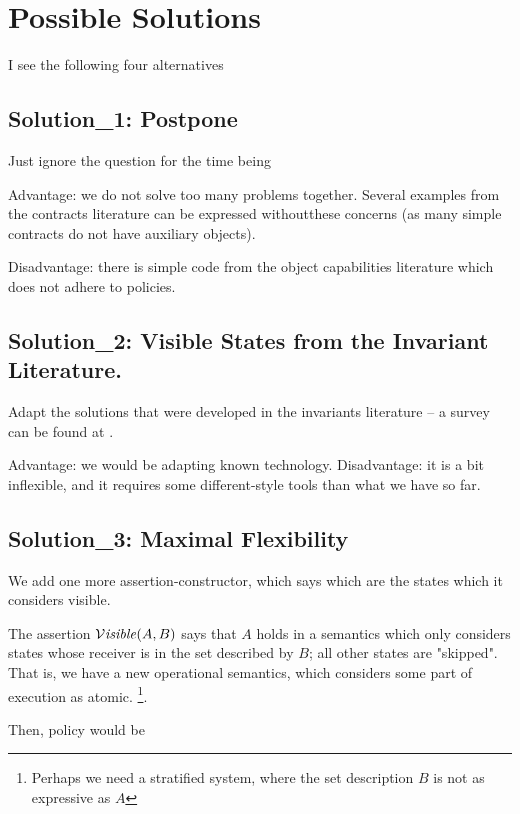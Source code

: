 \documentclass[acmsmall,screen]{acmart}
\begin{document}
  
  \section{Possible Solutions} 
  
 I see the following four alternatives
  
\subsection{Solution\_1: Postpone}
Just ignore the question for the time being


Advantage:  we do not solve too many problems together. Several examples from the contracts literature can be expressed withoutthese concerns (as many simple contracts do not have auxiliary objects).


Disadvantage: there is simple code from the object capabilities literature which does not adhere to policies.

\subsection{Solution\_2: Visible States from the Invariant Literature.}

Adapt the solutions that were developed in the invariants literature -- a survey can be 
found at \cite{DrossoFrancaMuellerSummers08}.
 
Advantage:  we would be adapting known technology.
Disadvantage:  it is a bit inflexible, and it
 requires some different-style tools than what we have so far.

\subsection{Solution\_3: Maximal Flexibility}


We add one more assertion-constructor, which says which are the states which it considers visible.

The assertion $\mathcal{V}\textrm{\textit{isible}}(A,B)$ says that $A$ holds in a semantics which only considers states whose  receiver is  in the set  described by $B$; all other states are "skipped". That is, we have a new operational semantics, which considers some part of execution as atomic. \footnote{Perhaps we need a stratified system, where the set description $B$ is not as expressive as $A$}.

Then, policy  would be
 
\end{document}
